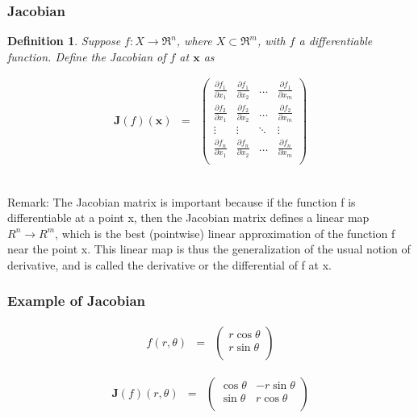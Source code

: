 \documentclass{beamer}
\newtheorem{defn}{Definition}
\numberwithin{equation}{section}
\begin{document}
\begin{frame}
\frametitle{Jacobian}

\begin{defn}
Suppose $f:X \rightarrow \Re^{n}$, where $X \subset \Re^{m}$, with $f$ a differentiable function.   Define the Jacobian of $f$ at $\boldsymbol{x}$ as 

\begin{eqnarray}
\boldsymbol{J}(f)(\boldsymbol{x} ) & = & \begin{pmatrix}
\frac{\partial f_{1}}{\partial x_{1} } & \frac{\partial f_{1}}{\partial x_{2} } & \hdots & \frac{\partial f_{1}} {\partial x_{m} } \\
\frac{\partial f_{2}}{\partial x_{1} } & \frac{\partial f_{2}}{\partial x_{2} } & \hdots & \frac{\partial f_{2}} {\partial x_{m} } \\
\vdots & \vdots & \ddots & \vdots \\
\frac{\partial f_{n} } {\partial x_{1} } & \frac{\partial f_{n} } {\partial x_{2} } & \hdots & \frac{\partial f_{n} } {\partial x_{m} } \\
\end{pmatrix} \nonumber 
\end{eqnarray}

\end{defn}

\ \\Remark: The Jacobian matrix is important because if the function f is differentiable at a point x, then the Jacobian matrix defines a linear map $R^{n} \rightarrow R^{m}$, which is the best (pointwise) linear approximation of the function f near the point x. This linear map is thus the generalization of the usual notion of derivative, and is called the derivative or the differential of f at x.

\end{frame}


\begin{frame}
\frametitle{Example of Jacobian}

\begin{eqnarray}
f(r, \theta) & = & \begin{pmatrix} 
r \cos \theta \\
r \sin \theta\\
\end{pmatrix} \nonumber 
\end{eqnarray}

\begin{eqnarray}
\boldsymbol{J}(f)(r, \theta) & = & 
\begin{pmatrix}
\cos \theta & - r \sin \theta  \\
\sin \theta &  r \cos \theta \\
\end{pmatrix} \nonumber 
\end{eqnarray}

\end{frame}
\end{document}
